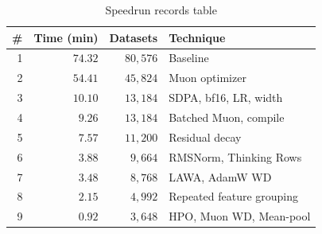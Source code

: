 \documentclass{article}
\theoremstyle{plain}
\theoremstyle{definition}
\theoremstyle{remark}
\begin{document}
\begin{table}[t]
  \centering
  \small
  \begin{tabular}{@{}rrrl@{}}
    \toprule
    \# & Time (min) & Datasets & Technique \\
    \midrule
    1 & $74.32$ & $80{,}576$ & Baseline \\
    2 & $54.41$ & $45{,}824$ & Muon optimizer \\
    3 & $10.10$ & $13{,}184$ & SDPA, bf16, LR, width \\
    4 & $\phantom{0}9.26$ & $13{,}184$ & Batched Muon, compile \\
    5 & $\phantom{0}7.57$ & $11{,}200$ & Residual decay \\
    6 & $\phantom{0}3.88$ & $\phantom{0}9{,}664$ & RMSNorm, Thinking Rows \\
    7 & $\phantom{0}3.48$ & $\phantom{0}8{,}768$ & LAWA, AdamW WD \\
    8 & $\phantom{0}2.15$ & $\phantom{0}4{,}992$ & Repeated feature grouping \\
    9 & $\phantom{0}0.92$ & $\phantom{0}3{,}648$ & HPO, Muon WD, Mean-pool \\
    \bottomrule
  \end{tabular}
  \caption{Speedrun records table}
  \label{tab:records}
\end{table}
\end{document}
